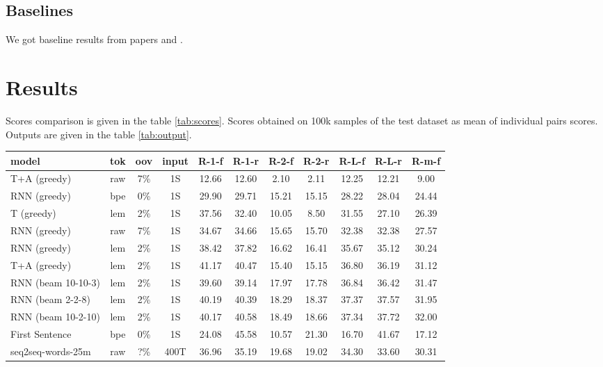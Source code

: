 \documentclass{article}
\begin{document}
\subsection{Baselines}
We got baseline results from papers \cite{gavrilov2018self} and \cite{gusev2019importance}.

\section{Results}

Scores comparison is given in the table \ref{tab:scores}. Scores obtained on 100k samples of the test dataset as mean of individual pairs scores. Outputs are given in the table \ref{tab:output}.

\begin{table}[tbh!]
\begin{center}
\setlength{\tabcolsep}{2pt}
\begin{tabular}[t]{|l|c|c|c|ccccccc|}
\hline
model & tok & oov & input & R-1-f & R-1-r & R-2-f & R-2-r & R-L-f & R-L-r & R-m-f  \\
\hline
T+A (greedy) & raw & 7\% & 1S & 12.66 & 12.60 & 2.10 & 2.11 & 12.25 & 12.21 & 9.00\\
RNN (greedy) & bpe & 0\% & 1S & 29.90 & 29.71 & 15.21 & 15.15 & 28.22 & 28.04 & 24.44 \\
T (greedy) & lem & 2\% & 1S & 37.56 & 32.40 & 10.05 & 8.50 & 31.55 & 27.10 & 26.39 \\
RNN (greedy) & raw & 7\% & 1S & 34.67 & 34.66 & 15.65 & 15.70 & 32.38 & 32.38 & 27.57 \\
RNN (greedy) & lem & 2\% & 1S & 38.42 & 37.82 & 16.62 & 16.41 & 35.67 & 35.12 & 30.24 \\
T+A (greedy) & lem & 2\% & 1S & 41.17 & 40.47 & 15.40 & 15.15 &
36.80 & 36.19 & 31.12 \\
RNN (beam 10-10-3) & lem  & 2\% &  1S & 39.60 & 39.14 & 17.97 & 17.78 & 36.84 & 36.42 & 31.47 \\
RNN (beam 2-2-8) & lem  & 2\% &  1S & 40.19 & 40.39 & 18.29 & 18.37 & 37.37 & 37.57 & 31.95\\
RNN (beam 10-2-10) & lem & 2\% & 1S & 40.17 & 40.58 & 18.49 & 18.66 & 37.34 & 37.72 & 32.00 \\
\hline
First Sentence \cite{gavrilov2018self} & bpe & 0\% & 1S & 24.08 & 45.58 & 10.57 & 21.30 & 16.70 & 41.67 & 17.12 \\
seq2seq-words-25m \cite{gusev2019importance} & raw & ?\% & 400T & 36.96 & 35.19 & 19.68 & 19.02 & 34.30 & 33.60 & 30.31 \\

\end{tabular}
\end{center}
\end{table}
\end{document}
